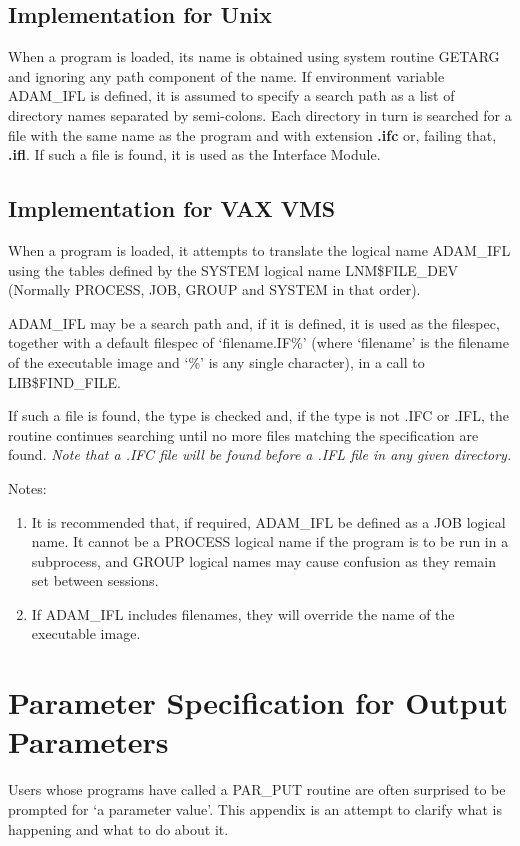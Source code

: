 \subsection{Implementation for Unix}
When a program is loaded, its name is obtained using system routine GETARG and
ignoring any path component of the name. 
If environment variable ADAM\_IFL is defined, it is
assumed to specify a search path as a list of directory names separated by
semi-colons.
Each directory in turn is searched for a file with the same name 
as the program and with extension {\bf .ifc} or, failing that, {\bf .ifl}. 
If such a file is found, it is used as the Interface Module.

\subsection{Implementation for VAX VMS}
When a program is loaded, it attempts to translate the logical name ADAM\_IFL 
using the tables defined by the SYSTEM logical name LNM\$FILE\_DEV (Normally
PROCESS, JOB, GROUP and SYSTEM in that order).

ADAM\_IFL may be a search path and, if it is defined, it is used as the 
filespec, together with a default filespec of `filename.IF\%' (where
`filename' is the filename of the executable image and `\%' is any single
character), in a call to LIB\$FIND\_FILE.

If such a file is found, the type is checked and, if the type is not .IFC
or .IFL, the routine continues searching until no more files matching 
the specification are found.
{\em Note that a .IFC file will be found before a .IFL file in any given
directory.}

Notes: 
\begin{enumerate}
\item It is recommended that, if required, ADAM\_IFL be defined as a JOB 
logical name.
It cannot be a PROCESS logical name if the program is to be run in a 
subprocess, and GROUP logical names may cause confusion as they remain set 
between sessions.
\item If ADAM\_IFL includes filenames, they will override the name of the 
executable image.
\end{enumerate}

\newpage
\section{Parameter Specification for Output Parameters}
\label{output}
Users whose programs have called a PAR\_PUT routine are often surprised
to be prompted for `a parameter value'.
This appendix is an attempt to clarify what is happening and what to do about
it.

